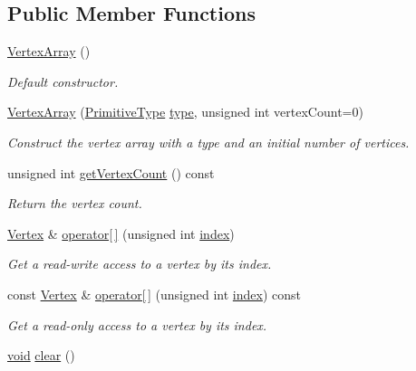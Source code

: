 \subsection*{Public Member Functions}
\begin{DoxyCompactItemize}
\item 
\hyperlink{classsf_1_1_vertex_array_a15729e01df8fc0021f9774dfb56295c1}{Vertex\-Array} ()
\begin{DoxyCompactList}\small\item\em Default constructor. \end{DoxyCompactList}\item 
\hyperlink{classsf_1_1_vertex_array_abf85f4baff4c282e2d07ea97b5913aad}{Vertex\-Array} (\hyperlink{group__graphics_ga5ee56ac1339984909610713096283b1b}{Primitive\-Type} \hyperlink{gl3_8h_a984aabed544368e7fe0e566d7cf014a7}{type}, unsigned int vertex\-Count=0)
\begin{DoxyCompactList}\small\item\em Construct the vertex array with a type and an initial number of vertices. \end{DoxyCompactList}\item 
unsigned int \hyperlink{classsf_1_1_vertex_array_a683fa176683f3b0343bab164608378f9}{get\-Vertex\-Count} () const 
\begin{DoxyCompactList}\small\item\em Return the vertex count. \end{DoxyCompactList}\item 
\hyperlink{classsf_1_1_vertex}{Vertex} \& \hyperlink{classsf_1_1_vertex_array_a5db1da21b170ecf4c52d49030db385fd}{operator\mbox{[}$\,$\mbox{]}} (unsigned int \hyperlink{gl3_8h_a57f14e05b1900f16a2da82ade47d0c6d}{index})
\begin{DoxyCompactList}\small\item\em Get a read-\/write access to a vertex by its index. \end{DoxyCompactList}\item 
const \hyperlink{classsf_1_1_vertex}{Vertex} \& \hyperlink{classsf_1_1_vertex_array_a0e95bde955c929651b0d9f8f00a354be}{operator\mbox{[}$\,$\mbox{]}} (unsigned int \hyperlink{gl3_8h_a57f14e05b1900f16a2da82ade47d0c6d}{index}) const 
\begin{DoxyCompactList}\small\item\em Get a read-\/only access to a vertex by its index. \end{DoxyCompactList}\item 
\hyperlink{glutf90_8h_ac778d6f63f1aaf8ebda0ce6ac821b56e}{void} \hyperlink{classsf_1_1_vertex_array_a3654c424aca1f9e468f369bc777c839c}{clear} ()

\end{DoxyCompactItemize}
